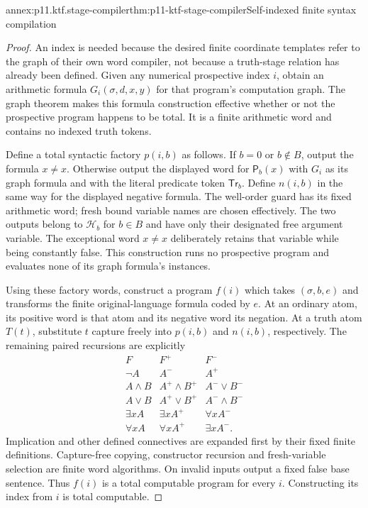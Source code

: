 \begin{annexitem}{annex:p11.ktf.stage-compiler}{thm:p11-ktf-stage-compiler}{Self-indexed finite syntax compilation}
\begin{proof}
An index is needed because the desired finite coordinate templates
refer to the graph of their own word compiler, not because a
truth-stage relation has already been defined. Given any numerical
prospective index \(i\), obtain an arithmetic formula
\(G_i(\sigma,d,x,y)\) for that program's computation graph.
The graph theorem makes this formula construction effective whether
or not the prospective program happens to be total. It is a
finite arithmetic word and contains no indexed truth tokens.

Define a total syntactic factory \(p(i,b)\) as follows. If
\(b=0\) or \(b\notin B\), output the formula \(x\ne x\).
Otherwise output the displayed word for \(\mathsf P_b(x)\)
with \(G_i\) as its graph formula and with the literal
predicate token \(\mathsf{Tr}_b\). Define \(n(i,b)\)
in the same way for the displayed negative formula. The well-order
guard has its fixed arithmetic word; fresh bound variable names
are chosen effectively. The two outputs belong to \(\mathcal H_b\)
for \(b\in B\) and have only their designated free
argument variable. The exceptional word \(x\ne x\) deliberately
retains that variable while being constantly false. This construction
runs no prospective program and evaluates none of its graph formula's
instances.

Using these factory words, construct a program \(f(i)\) which
takes \((\sigma,b,e)\) and transforms the finite original-language
formula coded by \(e\). At an ordinary atom, its positive
word is that atom and its negative word its negation. At a truth
atom \(T(t)\), substitute \(t\) capture freely into
\(p(i,b)\) and \(n(i,b)\), respectively. The remaining
paired recursions are explicitly
\[
\begin{array}{c|cc}
 F&F^+&F^-\\\hline
 \neg A&A^-&A^+\\
 A\land B&A^+\land B^+&A^-\lor B^-\\
 A\lor B&A^+\lor B^+&A^-\land B^-\\
 \exists x A&\exists x A^+&\forall x A^-\\
 \forall x A&\forall x A^+&\exists x A^- .
\end{array}
\]
Implication and other defined connectives are expanded first by
their fixed finite definitions. Capture-free copying, constructor
recursion and fresh-variable selection are finite word algorithms.
On invalid inputs output a fixed false base sentence. Thus
\(f(i)\) is a total computable program for every \(i\).
Constructing its index from \(i\) is total computable.


\end{proof}
\end{annexitem}
